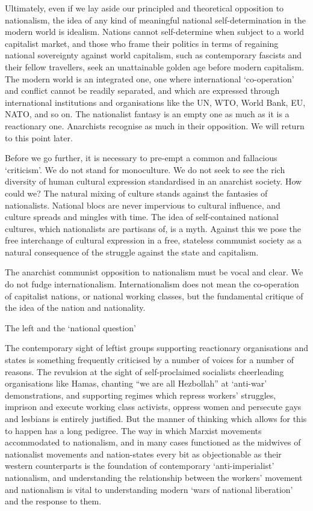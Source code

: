 Ultimately, even if we lay aside our principled and theoretical opposition to nationalism, the idea of any kind of meaningful national self-determination in the modern world is idealism. Nations cannot self-determine when subject to a world capitalist market, and those who frame their politics in terms of regaining national sovereignty against world capitalism, such as contemporary fascists and their fellow travellers, seek an unattainable golden age before modern capitalism. The modern world is an integrated one, one where international ‘co-operation’ and conflict cannot be readily separated, and which are expressed through international institutions and organisations like the UN, WTO, World Bank, EU, NATO, and so on. The nationalist fantasy is an empty one as much as it is a reactionary one. Anarchists recognise as much in their opposition. We will return to this point later.

Before we go further, it is necessary to pre-empt a common and fallacious ‘criticism’. We do not stand for monoculture. We do not seek to see the rich diversity of human cultural expression standardised in an anarchist society. How could we? The natural mixing of culture stands against the fantasies of nationalists. National blocs are never impervious to cultural influence, and culture spreads and mingles with time. The idea of self-contained national cultures, which nationalists are partisans of, is a myth. Against this we pose the free interchange of cultural expression in a free, stateless communist society as a natural consequence of the struggle against the state and capitalism.

The anarchist communist opposition to nationalism must be vocal and clear. We do not fudge internationalism. Internationalism does not mean the co-operation of capitalist nations, or national working classes, but the fundamental critique of the idea of the nation and nationality.

The left and the ‘national question’

The contemporary sight of leftist groups supporting reactionary organisations and states is something frequently criticised by a number of voices for a number of reasons. The revulsion at the sight of self-proclaimed socialists cheerleading organisations like Hamas, chanting “we are all Hezbollah” at ‘anti-war’ demonstrations, and supporting regimes which repress workers’ struggles, imprison and execute working class activists, oppress women and persecute gays and lesbians is entirely justified. But the manner of thinking which allows for this to happen has a long pedigree. The way in which Marxist movements accommodated to nationalism, and in many cases functioned as the midwives of nationalist movements and nation-states every bit as objectionable as their western counterparts is the foundation of contemporary ‘anti-imperialist’ nationalism, and understanding the relationship between the workers’ movement and nationalism is vital to understanding modern ‘wars of national liberation’ and the response to them.

